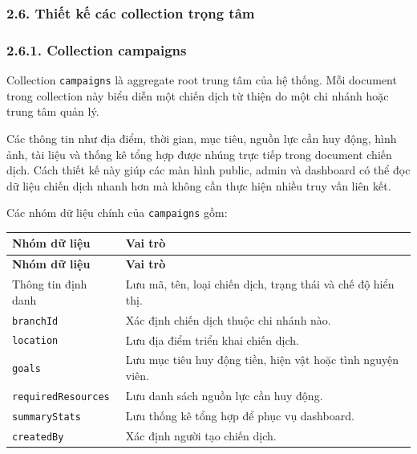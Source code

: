 \documentclass[12pt,a4paper]{article}
\begin{document}
\subsubsection*{2.6. Thiết kế các collection trọng tâm}

\subsubsection*{2.6.1. Collection campaigns}

Collection \texttt{campaigns} là aggregate root trung tâm của hệ thống. Mỗi document trong collection này biểu diễn một chiến dịch từ thiện do một chi nhánh hoặc trung tâm quản lý.

Các thông tin như địa điểm, thời gian, mục tiêu, nguồn lực cần huy động, hình ảnh, tài liệu và thống kê tổng hợp được nhúng trực tiếp trong document chiến dịch. Cách thiết kế này giúp các màn hình public, admin và dashboard có thể đọc dữ liệu chiến dịch nhanh hơn mà không cần thực hiện nhiều truy vấn liên kết.

Các nhóm dữ liệu chính của \texttt{campaigns} gồm:

\begin{center}
\small
\begin{longtable}{|p{3.8cm}|p{8.7cm}|}
\hline
\textbf{Nhóm dữ liệu} & \textbf{Vai trò} \\ \hline
\endfirsthead
\hline
\textbf{Nhóm dữ liệu} & \textbf{Vai trò} \\ \hline
\endhead
Thông tin định danh & Lưu mã, tên, loại chiến dịch, trạng thái và chế độ hiển thị. \\ \hline
\texttt{branchId} & Xác định chiến dịch thuộc chi nhánh nào. \\ \hline
\texttt{location} & Lưu địa điểm triển khai chiến dịch. \\ \hline
\texttt{goals} & Lưu mục tiêu huy động tiền, hiện vật hoặc tình nguyện viên. \\ \hline
\texttt{requiredResources} & Lưu danh sách nguồn lực cần huy động. \\ \hline
\texttt{summaryStats} & Lưu thống kê tổng hợp để phục vụ dashboard. \\ \hline
\texttt{createdBy} & Xác định người tạo chiến dịch. \\ \hline
\end{longtable}
\normalsize
\end{center}
\end{document}
